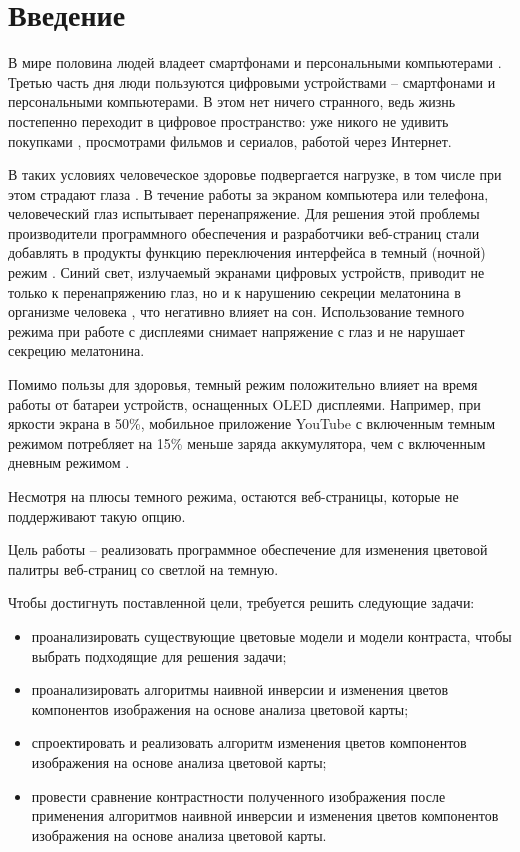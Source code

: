 \chapter*{Введение}

В мире половина людей владеет смартфонами \cite{smartphones} и персональными компьютерами \cite{pcs}. Третью часть дня \cite{digitalconsumption} люди пользуются цифровыми устройствами -- смартфонами и персональными компьютерами. В этом нет ничего странного, ведь жизнь постепенно переходит в цифровое пространство: уже никого не удивить покупками \cite{onlineshopping}, просмотрами фильмов и сериалов, работой через Интернет.

В таких условиях человеческое здоровье подвергается нагрузке, в том числе при этом страдают глаза \cite{digitaleyestrain}. В течение работы за экраном компьютера или телефона, человеческий глаз испытывает перенапряжение.  Для решения этой проблемы производители программного обеспечения и разработчики веб-страниц стали добавлять в продукты функцию переключения интерфейса в темный (ночной) режим  \cite{darkmode}. Синий свет, излучаемый экранами цифровых устройств, приводит не только к перенапряжению глаз, но и к нарушению секреции мелатонина в организме человека \cite{melatonin}, что негативно влияет на сон. Использование темного режима при работе с дисплеями снимает напряжение с глаз и не нарушает секрецию мелатонина.

Помимо пользы для здоровья, темный режим положительно влияет \cite{batterysaving} на время работы от батареи устройств, оснащенных OLED \cite{OLED} дисплеями. Например, при яркости экрана в 50\%, мобильное приложение YouTube \cite{youtube} с включенным темным режимом потребляет на 15\% меньше заряда аккумулятора, чем с включенным дневным режимом \cite{batterysaving}.

Несмотря на плюсы темного режима, остаются веб-страницы, которые не поддерживают такую опцию.

Цель работы -- реализовать программное обеспечение для изменения цветовой палитры веб-страниц со светлой на темную. 

Чтобы достигнуть поставленной цели, требуется решить следующие задачи:
\begin{itemize}
	\item проанализировать существующие цветовые модели и модели контраста, чтобы выбрать подходящие для решения задачи;
	\item проанализировать алгоритмы наивной инверсии и изменения цветов компонентов изображения на основе анализа цветовой карты;
	\item спроектировать и реализовать алгоритм изменения цветов компонентов изображения на основе анализа цветовой карты;
	\item провести сравнение контрастности полученного изображения после применения алгоритмов наивной инверсии и изменения цветов компонентов изображения на основе анализа цветовой карты.
\end{itemize}

